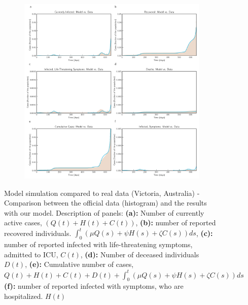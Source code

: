 \documentclass[10pt]{wlscirep}
\begin{document}
\begin{figure}[t!]
	\centering
	\begin{subfigure}[b]{\textwidth}
		\centering
		\includegraphics[width=1\linewidth]{Victoria_plot_model_data.pdf}
	\end{subfigure}
	\caption{Model simulation compared to real data (Victoria, Australia) - Comparison between the official data (histogram) and the results with our model. Description of panels: \textbf{(a):} Number of currently active cases, $\left( Q(t) + H(t) + C(t)\right)$, \textbf{(b):} number of reported recovered individuals. $\int_{0}^{t}{\left( \mu Q(s) + \psi H(s) + \zeta  C(s) \right) ds}$, \textbf{(c):} number of reported infected with life-threatening symptoms, admitted to ICU, $C(t)$, \textbf{(d):} Number of deceased individuals $D(t)$, \textbf{(e):} Cumulative number of cases, $Q(t) + H(t) + C(t) + D(t) + \int_{0}^{t}{\left( \mu Q(s) + \psi H(s) + \zeta  C(s) \right) ds}$ \textbf{(f):} number of reported infected with symptoms, who are hospitalized. $H(t)$}
	\label{fig10A} 
\end{figure}
%
%
\end{document}
